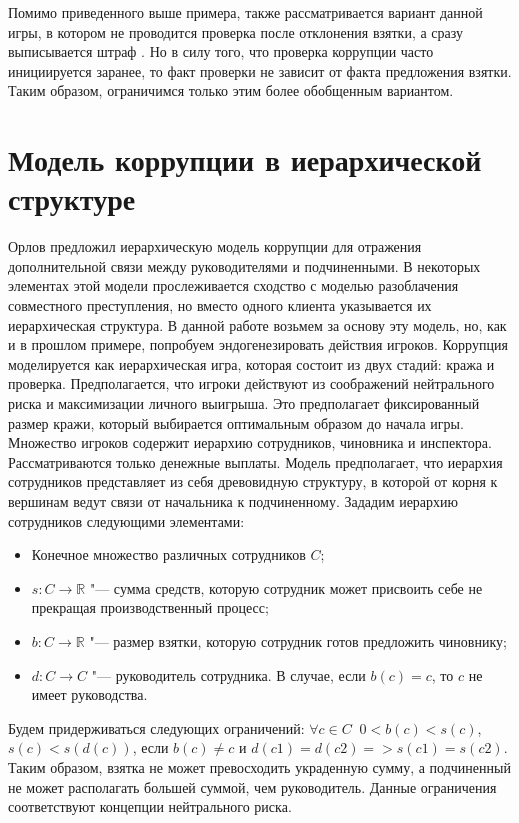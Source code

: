 \par
Помимо приведенного выше примера, также рассматривается вариант данной игры, в котором не проводится проверка после отклонения взятки, а сразу выписывается штраф \cite{Spengler}. Но в силу того, что проверка коррупции часто инициируется заранее, то факт проверки не зависит от факта предложения взятки. Таким образом, ограничимся только этим более обобщенным вариантом.
\section{Модель коррупции в иерархической структуре}
Орлов\cite{Orlov} предложил иерархическую модель коррупции для отражения дополнительной связи между руководителями и подчиненными. В некоторых элементах этой модели прослеживается сходство с моделью разоблачения совместного преступления, но вместо одного клиента указывается их иерархическая структура. В данной работе возьмем за основу эту модель, но, как и в прошлом примере, попробуем эндогенезировать действия игроков.
Коррупция моделируется как иерархическая игра, которая состоит из двух стадий: кража и проверка. Предполагается, что игроки действуют из соображений нейтрального риска и максимизации личного выигрыша. Это предполагает фиксированный размер кражи, который выбирается оптимальным образом до начала игры. Множество игроков содержит иерархию сотрудников, чиновника и инспектора.  Рассматриваются только денежные выплаты. Модель предполагает, что иерархия сотрудников представляет из себя древовидную структуру, в которой от корня к вершинам ведут связи от начальника к подчиненному.
Зададим иерархию сотрудников следующими элементами:
\begin{itemize}
\item Конечное множество различных сотрудников $C$;
\item $s\colon C\to \mathbb{R}$ "--- сумма средств, которую сотрудник может присвоить себе не прекращая производственный процесс;
\item $b\colon C\to \mathbb{R}$ "--- размер взятки, которую сотрудник готов предложить чиновнику;
\item $d\colon C\to C$ "--- руководитель сотрудника. В случае, если  $b(c) = c$, то $c$ не имеет руководства.
 
\end{itemize}
Будем придерживаться следующих ограничений: $\forall c \in C\;\;0 < b(c) < s(c)$, $s(c) < s(d(c))$, если $b(c) \neq c$ и $d(c1)=d(c2) =>s(c1)=s(c2)$. Таким образом, взятка не может превосходить украденную сумму, а подчиненный не может располагать большей суммой, чем руководитель. Данные ограничения соответствуют концепции нейтрального риска\cite{Orlov}.
